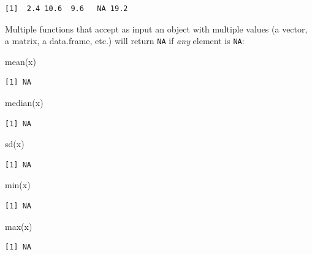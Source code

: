 \documentclass[
]{book}
\newenvironment{Shaded}{\begin{snugshade}}{\end{snugshade}}
\newcommand{\FunctionTok}[1]{\textcolor[rgb]{0.00,0.00,0.00}{#1}}
\newcommand{\NormalTok}[1]{#1}
\begin{document}
\begin{verbatim}
[1]  2.4 10.6  9.6   NA 19.2
\end{verbatim}

Multiple functions that accept as input an object with multiple values (a vector, a matrix, a data.frame, etc.) will return \texttt{NA} if \emph{any} element is \texttt{NA}:

\begin{Shaded}
\begin{Highlighting}[]
\FunctionTok{mean}\NormalTok{(x)}
\end{Highlighting}
\end{Shaded}

\begin{verbatim}
[1] NA
\end{verbatim}

\begin{Shaded}
\begin{Highlighting}[]
\FunctionTok{median}\NormalTok{(x)}
\end{Highlighting}
\end{Shaded}

\begin{verbatim}
[1] NA
\end{verbatim}

\begin{Shaded}
\begin{Highlighting}[]
\FunctionTok{sd}\NormalTok{(x)}
\end{Highlighting}
\end{Shaded}

\begin{verbatim}
[1] NA
\end{verbatim}

\begin{Shaded}
\begin{Highlighting}[]
\FunctionTok{min}\NormalTok{(x)}
\end{Highlighting}
\end{Shaded}

\begin{verbatim}
[1] NA
\end{verbatim}

\begin{Shaded}
\begin{Highlighting}[]
\FunctionTok{max}\NormalTok{(x)}
\end{Highlighting}
\end{Shaded}

\begin{verbatim}
[1] NA
\end{verbatim}
\end{document}

